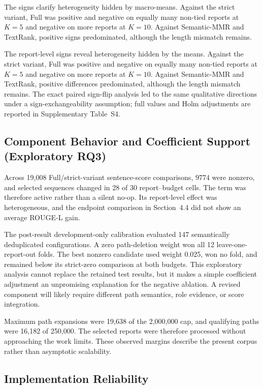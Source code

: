 \documentclass[applsci,article,submit,moreauthors]{Definitions/mdpi}
\begin{document}
The signs clarify heterogeneity hidden by macro-means. Against the strict variant, Full was positive and negative on equally many non-tied reports at $K=5$ and negative on more reports at $K=10$. Against Semantic-MMR and TextRank, positive signs predominated, although the length mismatch remains.

The report-level signs reveal heterogeneity hidden by the means. Against the strict variant, Full was positive and negative on equally many non-tied reports at $K=5$ and negative on more reports at $K=10$. Against Semantic-MMR and TextRank, positive differences predominated, although the length mismatch remains. The exact paired sign-flip analysis led to the same qualitative directions under a sign-exchangeability assumption; full values and Holm adjustments are reported in Supplementary Table~S4.

\subsection{Component Behavior and Coefficient Support (Exploratory RQ3)}

Across 19,008 Full/strict-variant sentence-score comparisons, 9774 were nonzero, and selected sequences changed in 28 of 30 report--budget cells. The term was therefore active rather than a silent no-op. Its report-level effect was heterogeneous, and the endpoint comparison in Section~4.4 did not show an average ROUGE-L gain.

The post-result development-only calibration evaluated 147 semantically deduplicated configurations. A zero path-deletion weight won all 12 leave-one-report-out folds. The best nonzero candidate used weight 0.025, won no fold, and remained below its strict-zero comparison at both budgets. This exploratory analysis cannot replace the retained test results, but it makes a simple coefficient adjustment an unpromising explanation for the negative ablation. A revised component will likely require different path semantics, role evidence, or score integration.

Maximum path expansions were 19,638 of the 2,000,000 cap, and qualifying paths were 16,182 of 250,000. The selected reports were therefore processed without approaching the work limits. These observed margins describe the present corpus rather than asymptotic scalability.

\subsection{Implementation Reliability}
\end{document}
